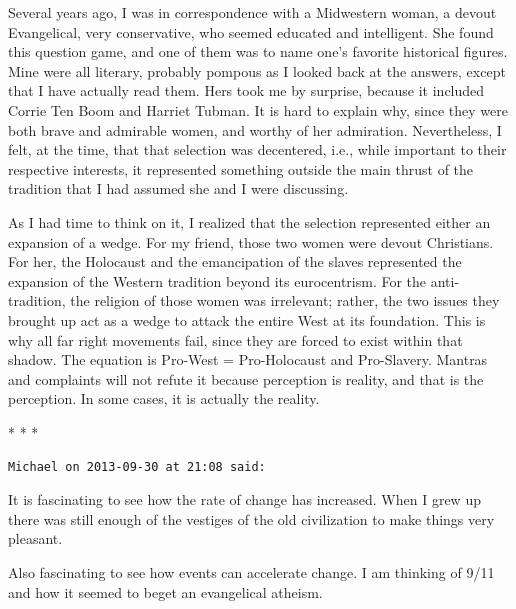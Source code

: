 Several years ago, I was in correspondence with a Midwestern woman, a devout Evangelical, very conservative, who seemed educated and intelligent. She found this question game, and one of them was to name one's favorite historical figures. Mine were all literary, probably pompous as I looked back at the answers, except that I have actually read them. Hers took me by surprise, because it included Corrie Ten Boom and Harriet Tubman. It is hard to explain why, since they were both brave and admirable women, and worthy of her admiration. Nevertheless, I felt, at the time, that that selection was decentered, i.e., while important to their respective interests, it represented something outside the main thrust of the tradition that I had assumed she and I were discussing.

As I had time to think on it, I realized that the selection represented either an expansion of a wedge. For my friend, those two women were devout Christians. For her, the Holocaust and the emancipation of the slaves represented the expansion of the Western tradition beyond its eurocentrism. For the anti-tradition, the religion of those women was irrelevant; rather, the two issues they brought up act as a wedge to attack the entire West at its foundation. This is why all far right movements fail, since they are forced to exist within that shadow. The equation is Pro-West = Pro-Holocaust and Pro-Slavery. Mantras and complaints will not refute it because perception is reality, and that is the perception. In some cases, it is actually the reality.



\begin{center}* * *\end{center}

\begin{footnotesize}
\begin{sffamily}

\texttt{Michael on 2013-09-30 at 21:08 said:}

It is fascinating to see how the rate of change has increased. When I grew up there was still enough of the vestiges of the old civilization to make things very pleasant.

Also fascinating to see how events can accelerate change. I am thinking of 9/11 and how it seemed to beget an evangelical atheism.

\hfill

\end{sffamily}
\end{footnotesize}

